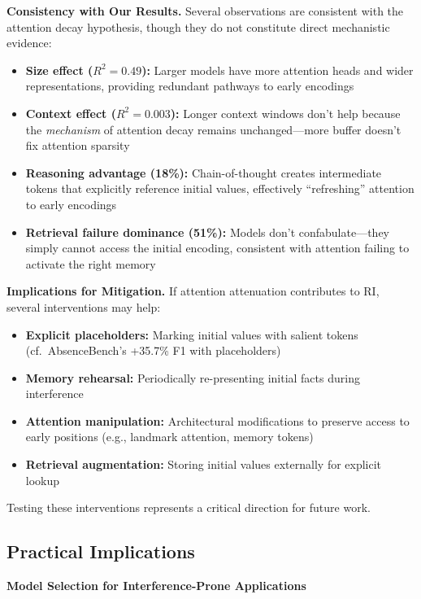 \documentclass{article}
\begin{document}
\textbf{Consistency with Our Results.}
Several observations are consistent with the attention decay hypothesis, though they do not constitute direct mechanistic evidence:
\begin{itemize}[itemsep=2pt,topsep=3pt,parsep=0pt]
    \item \textbf{Size effect ($R^2 = 0.49$):} Larger models have more attention heads and wider representations, providing redundant pathways to early encodings
    \item \textbf{Context effect ($R^2 = 0.003$):} Longer context windows don't help because the \textit{mechanism} of attention decay remains unchanged---more buffer doesn't fix attention sparsity
    \item \textbf{Reasoning advantage (18\%):} Chain-of-thought creates intermediate tokens that explicitly reference initial values, effectively ``refreshing'' attention to early encodings
    \item \textbf{Retrieval failure dominance (51\%):} Models don't confabulate---they simply cannot access the initial encoding, consistent with attention failing to activate the right memory
\end{itemize}

\textbf{Implications for Mitigation.}
If attention attenuation contributes to RI, several interventions may help:
\begin{itemize}[itemsep=2pt,topsep=3pt,parsep=0pt]
    \item \textbf{Explicit placeholders:} Marking initial values with salient tokens (cf.\ AbsenceBench's +35.7\% F1 with placeholders)
    \item \textbf{Memory rehearsal:} Periodically re-presenting initial facts during interference
    \item \textbf{Attention manipulation:} Architectural modifications to preserve access to early positions (e.g., landmark attention, memory tokens)
    \item \textbf{Retrieval augmentation:} Storing initial values externally for explicit lookup
\end{itemize}

Testing these interventions represents a critical direction for future work.

\subsection{Practical Implications}

\textbf{Model Selection for Interference-Prone Applications}
\end{document}
